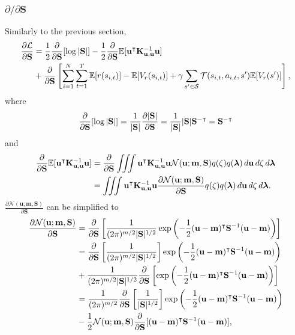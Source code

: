 \documentclass{mprop}
\theoremstyle{definition}
\begin{document}
\subsubsection{$\partial/\partial\mathbf{S}$}

Similarly to the previous section,
\[
  \begin{split}
    \frac{\partial\mathcal{L}}{\partial\mathbf{S}} &=
    \frac{1}{2}\frac{\partial}{\partial\mathbf{S}}[\log|\mathbf{S}|]
    -\frac{1}{2}\frac{\partial}{\partial\mathbf{S}}\mathbb{E}[\mathbf{u}^\intercal\mathbf{K}_{\mathbf{u},\mathbf{u}}^{-1}\mathbf{u}] \\
    &+ \frac{\partial}{\partial\mathbf{S}}\left[\sum_{i=1}^N \sum_{t=1}^T \mathbb{E}[r(s_{i,t})] -
      \mathbb{E}[V_r(s_{i,t})] + \gamma\sum_{s' \in \mathcal{S}}
      \mathcal{T}(s_{i,t}, a_{i,t}, s')\mathbb{E}[V_r(s')]\right],
  \end{split}
\]
where %
\[ \frac{\partial}{\partial\mathbf{S}}[\log|\mathbf{S}|] =
  \frac{1}{|\mathbf{S}|}\frac{\partial|\mathbf{S}|}{\partial \mathbf{S}} =
  \frac{1}{|\mathbf{S}|}|\mathbf{S}|\mathbf{S}^{-\intercal} =
  \mathbf{S}^{-\intercal} \]
and
\[
  \begin{split}
    \frac{\partial}{\partial\mathbf{S}}\mathbb{E}[\mathbf{u}^\intercal\mathbf{K}_{\mathbf{u},\mathbf{u}}^{-1}\mathbf{u}] &=
    \frac{\partial}{\partial\mathbf{S}}\iiint\mathbf{u}^\intercal\mathbf{K}_{\mathbf{u},\mathbf{u}}^{-1}\mathbf{u}\mathcal{N}(\mathbf{u};
    \mathbf{m},
    \mathbf{S})q(\zeta)q(\bm\lambda)\,d\mathbf{u}\,d\zeta\,d\bm\lambda \\
    &=
    \iiint\mathbf{u}^\intercal\mathbf{K}_{\mathbf{u},\mathbf{u}}^{-1}\mathbf{u}\frac{\partial \mathcal{N}(\mathbf{u};
      \mathbf{m}, \mathbf{S})}{\partial \mathbf{S}}q(\zeta)q(\bm\lambda)\,d\mathbf{u}\,d\zeta\,d\bm\lambda.
  \end{split}
\]
$\frac{\partial \mathcal{N}(\mathbf{u}; \mathbf{m}, \mathbf{S})}{\partial \mathbf{S}}$ can be simplified to
\[
  \begin{split}
    \frac{\partial \mathcal{N}(\mathbf{u}; \mathbf{m}, \mathbf{S})}{\partial \mathbf{S}} &=
    \frac{\partial}{\partial\mathbf{S}}\left[\frac{1}{(2\pi)^{m/2}|\mathbf{S}|^{1/2}}\exp \left( -\frac{1}{2}
        (\mathbf{u} - \mathbf{m})^\intercal\mathbf{S}^{-1}(\mathbf{u} -
        \mathbf{m})\right)\right] \\
    &= \frac{\partial}{\partial\mathbf{S}}\left[\frac{1}{(2\pi)^{m/2}|\mathbf{S}|^{1/2}}\right]\exp \left( -\frac{1}{2}
        (\mathbf{u} - \mathbf{m})^\intercal\mathbf{S}^{-1}(\mathbf{u} -
        \mathbf{m})\right) \\
      &+ \frac{1}{(2\pi)^{m/2}|\mathbf{S}|^{1/2}}\frac{\partial}{\partial\mathbf{S}}\left[\exp\left( -\frac{1}{2}
        (\mathbf{u} - \mathbf{m})^\intercal\mathbf{S}^{-1}(\mathbf{u} -
        \mathbf{m})\right)\right] \\
    &=
    \frac{1}{(2\pi)^{m/2}}\frac{\partial}{\partial\mathbf{S}}\left[\frac{1}{|\mathbf{S}|^{1/2}}\right]\exp
    \left( -\frac{1}{2} (\mathbf{u} -
      \mathbf{m})^\intercal\mathbf{S}^{-1}(\mathbf{u} - \mathbf{m})\right) \\
    &- \frac{1}{2}\mathcal{N}(\mathbf{u}; \mathbf{m}, \mathbf{S})\frac{\partial}{\partial\mathbf{S}}[(\mathbf{u}
    - \mathbf{m})^\intercal\mathbf{S}^{-1}(\mathbf{u} - \mathbf{m})], \\
  \end{split}
\]
\end{document}
